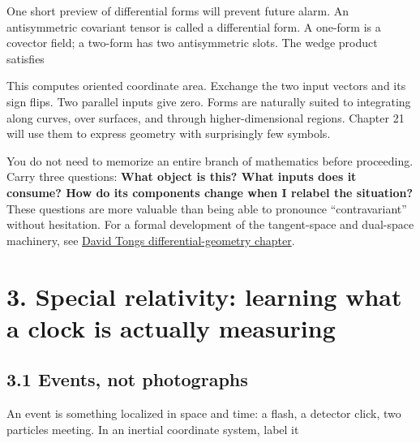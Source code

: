 \documentclass[
  11pt,
  letterpaper,
  oneside,
  openany]{scrbook}
\begin{document}
One short preview of differential forms will prevent future alarm. An
antisymmetric covariant tensor is called a differential form. A one-form
is a covector field; a two-form has two antisymmetric slots. The wedge
product satisfies

\begin{center}
\begingroup
{}
\ifdim\wd\grmathbox>\linewidth
\resizebox{\linewidth}{!}{\usebox{\grmathbox}}
\else\usebox{\grmathbox}\fi
\endgroup
\end{center}

This computes oriented coordinate area. Exchange the two input vectors
and its sign flips. Two parallel inputs give zero. Forms are naturally
suited to integrating along curves, over surfaces, and through
higher-dimensional regions. Chapter 21 will use them to express geometry
with surprisingly few symbols.

You do not need to memorize an entire branch of mathematics before
proceeding. Carry three questions: \textbf{What object is this? What
inputs does it consume? How do its components change when I relabel the
situation?} These questions are more valuable than being able to
pronounce ``contravariant'' without hesitation. For a formal development
of the tangent-space and dual-space machinery, see
\href{https://davidtong.org/pdfs/teaching/general-relativity/gr2.pdf}{David
Tong\textquotesingle s differential-geometry chapter}.

\hypertarget{chapter-3}{%
\chapter{3. Special relativity: learning what a clock is actually
measuring}\label{chapter-3}}

\hypertarget{events-not-photographs}{%
\section{3.1 Events, not photographs}\label{events-not-photographs}}

An event is something localized in space and time: a flash, a detector
click, two particles meeting. In an inertial coordinate system, label it

\begin{center}
\begingroup
{}
\ifdim\wd\grmathbox>\linewidth
\resizebox{\linewidth}{!}{\usebox{\grmathbox}}
\else\usebox{\grmathbox}\fi
\endgroup
\end{center}
\end{document}
